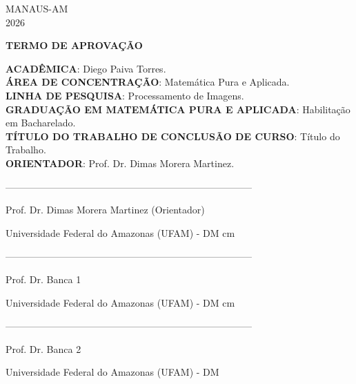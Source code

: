 \documentclass[a4paper,12pt]{report}
\begin{document}
	
	
	\vspace{4cm}
	\begin{center}
		MANAUS-AM\\ 2026
	\end{center}
	\newpage
	
	\thispagestyle{empty}
	\begin{center}
		{\textbf{TERMO DE APROVAÇÃO}} 	
	\end{center}
	
	\vspace{1cm}
	
	\textbf{ACADÊMICA}: Diego Paiva Torres.\\
	
	\textbf{ÁREA DE CONCENTRAÇÃO}: Matemática Pura e Aplicada.\\
	
	\textbf{LINHA DE PESQUISA}: Processamento de Imagens.\\
	
	\textbf{GRADUAÇÃO EM MATEMÁTICA PURA E APLICADA}: Habilitação em Bacharelado.\\
	
	\textbf{TÍTULO DO TRABALHO DE CONCLUSÃO DE CURSO}: Título do Trabalho. \\
	
	\textbf{ORIENTADOR}: Prof. Dr. Dimas Morera Martinez.\\
	
	\vspace{5cm}
	
	\begin{center}
		
		
		
		-----------------------------------------------------------------------------
		
		Prof. Dr.  Dimas Morera Martinez (Orientador)
		
		Universidade Federal do Amazonas (UFAM) - DM
		 cm
		
		-----------------------------------------------------------------------------
		
		Prof. Dr. Banca 1
		
		Universidade Federal do Amazonas (UFAM) - DM
		 cm
		
		-----------------------------------------------------------------------------
		
		Prof. Dr. Banca 2
		
		Universidade Federal do Amazonas (UFAM) - DM
	\end{center}
	
\end{document}
